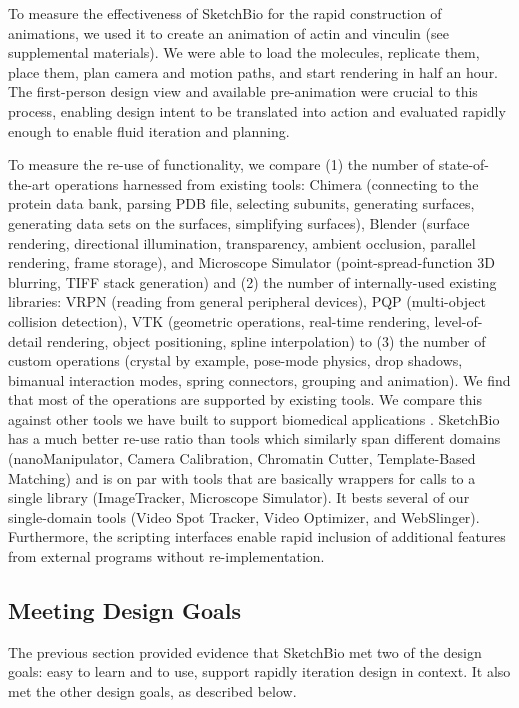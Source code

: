\documentclass[twocolumn]{bmcart}%
\begin{document}
To measure the effectiveness of SketchBio for the rapid construction of animations, we used it to create an animation of actin and vinculin (see supplemental materials).
We were able to load the molecules, replicate them, place them, plan camera and motion paths, and start rendering in half an hour.
The first-person design view and available pre-animation were crucial to this process, enabling design intent to be translated into action and evaluated rapidly enough to enable fluid iteration and planning.

To measure the re-use of functionality, we compare (1) the number of state-of-the-art operations harnessed from existing tools: Chimera (connecting to the protein data bank, parsing PDB file, selecting subunits, generating surfaces, generating data sets on the surfaces, simplifying surfaces), Blender (surface rendering, directional illumination, transparency, ambient occlusion, parallel rendering, frame storage), and Microscope Simulator (point-spread-function 3D blurring, TIFF stack generation) and (2) the number of internally-used existing libraries: VRPN (reading from general peripheral devices), PQP (multi-object collision detection), VTK (geometric operations, real-time rendering, level-of-detail rendering, object positioning, spline interpolation) to (3) the number of custom operations (crystal by example, pose-mode physics, drop shadows, bimanual interaction modes, spring connectors, grouping and animation).  We find that most of the operations are supported by existing tools.
We compare this against other tools we have built to support biomedical applications \cite{CISMMapps}. SketchBio has a much better re-use ratio than tools which similarly span different domains (nanoManipulator, Camera Calibration, Chromatin Cutter, Template-Based Matching) and is on par with tools that are basically wrappers for calls to a single library (ImageTracker, Microscope Simulator).  It bests several of our single-domain tools (Video Spot Tracker, Video Optimizer, and WebSlinger).
Furthermore, the scripting interfaces enable rapid inclusion of additional features from external programs without re-implementation.

\subsection*{Meeting Design Goals}
The previous section provided evidence that SketchBio met two of the design goals: easy to learn and to use, support rapidly iteration design in context.  It also met the other design goals, as described below.
\end{document}
